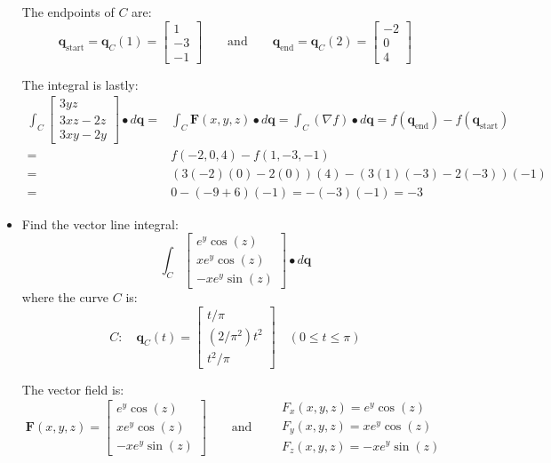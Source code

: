 \documentclass{article}
\begin{document}
\begin{itemize}
The endpoints of \(C\) are: 
\[\mathbf{q}_{\text{start}} = \mathbf{q}_C(1) = \begin{bmatrix} 1 \\ -3 \\ -1 \end{bmatrix}
\quad\quad\text{and}\quad\quad 
\mathbf{q}_{\text{end}} = \mathbf{q}_C(2) = \begin{bmatrix} -2 \\ 0 \\ 4 \end{bmatrix}\]

The integral is lastly:
\begin{align*}
\int_C \begin{bmatrix}
3yz \\ 
3xz - 2z \\ 
3xy - 2y
\end{bmatrix} \bullet d\mathbf{q} = & \int_C \mathbf{F}(x,y,z) \bullet d\mathbf{q} 
= \int_C (\nabla f) \bullet d\mathbf{q} 
= f(\mathbf{q}_{\text{end}}) - f(\mathbf{q}_{\text{start}}) \\  
= & f(-2, 0, 4) - f(1, -3, -1) \\ 
= & (3(-2)(0) - 2(0))(4) - (3(1)(-3) - 2(-3))(-1) \\ 
= & 0 - (-9 + 6)(-1) 
= -(-3)(-1) 
= -3 
\end{align*}

\item
Find the vector line integral: 
\[\int_C \begin{bmatrix}
e^y \cos(z) \\ 
x e^y \cos(z) \\ 
-x e^y \sin(z)
\end{bmatrix} \bullet d\mathbf{q}\]
where the curve \(C\) is:
\[C : \quad \mathbf{q}_C(t) = \begin{bmatrix}
t/\pi \\ 
(2/\pi^2)t^2 \\ 
t^2/\pi
\end{bmatrix} \quad 
(0 \leq t \leq \pi)\]
 
The vector field is:
\[\mathbf{F}(x,y,z) = \begin{bmatrix}
e^y \cos(z) \\ 
x e^y \cos(z) \\ 
-x e^y \sin(z)
\end{bmatrix} \quad\quad\text{and}\quad\quad \begin{array}{l} 
F_x(x,y,z) = e^y \cos(z) \\ 
F_y(x,y,z) = x e^y \cos(z) \\ 
F_z(x,y,z) = -x e^y \sin(z)
\end{array}\]


\end{itemize}
\end{document}
